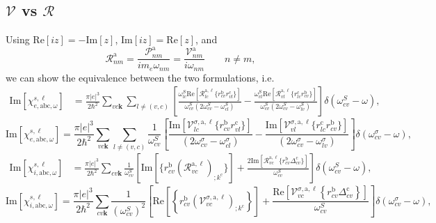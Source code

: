 \subsection{\texorpdfstring{$\mathcal{V}$ vs $\mathcal{R}$}{V vs R}}

Using 
$\mathrm{Re}[iz]=-\mathrm{Im}[z]$,
$\mathrm{Im}[iz]=\mathrm{Re}[z]$,
and
\begin{equation}\label{rnmenm91}
\mathcal{R}^\mathrm{a}_{nm}=\frac{\mathcal{P}^\mathrm{a}_{nm}}{im_e\omega_{nm}}=\frac{\mathcal{V}^\mathrm{a}_{nm}}{i\omega_{nm}}
\quad\quad n\ne m
,
\end{equation}
we can show the equivalence between the two formulations, i.e.
\begin{align}\label{imchiew}
\mathrm{Im}[\chi_{e,\mathrm{a}\mathrm{b}\mathrm{c},\omega}^{s,\ell}]
&=
\frac{\pi |e|^3}{2\hbar^2} 
\sum_{vc\mathbf{k}}
\sum_{l\neq(v,c)}
\left[
\frac{\omega^S_{lc}\mathrm{Re}[\mathcal{R}^{\mathrm{a},\ell}_{lc}\{r^{\mathrm{b}}_{cv}r^{\mathrm{c}}_{vl}\}]}
{\omega^S_{cv}(2\omega^S_{cv}-\omega^S_{cl})}
-
\frac{\omega^S_{vl}\mathrm{Re}[\mathcal{R}^{\mathrm{a},\ell}_{vl}\{r^{\mathrm{c}}_{lc}r^{\mathrm{b}}_{cv}\}]}
{\omega^S_{cv}(2\omega^S_{cv}-\omega^S_{lv})}
\right]
\delta(\omega^S_{cv}-\omega)
,
\end{align}  
\begin{equation}\label{c-calvimchiewn}
\mathrm{Im}[\chi_{e,\mathrm{a}\mathrm{b}\mathrm{c},\omega}^{s,\ell}] =
\frac{\pi |e|^3}{2\hbar^2}\sum_{vc\mathbf{k}}\sum_{l\neq(v,c)}\frac{1}{\omega^{S}_{cv}}
\left[
\frac{\mathrm{Im}[\mathcal{V}^{\sigma,\text{a},\ell}_{lc}\{r^{\mathrm{b}}_{cv}r^{\mathrm{c}}_{vl}\}]}
{(2\omega^\sigma_{cv}-\omega^\sigma_{cl})} 
-\frac{\mathrm{Im}[\mathcal{V}^{\sigma,\text{a},\ell}_{vl}\{r^{\mathrm{c}}_{lc}r^{\mathrm{b}}_{cv}\}]}
{(2\omega^\sigma_{cv}-\omega^\sigma_{lv})}
\right]\delta(\omega^\sigma_{cv}-\omega),
\end{equation}  
\begin{align}\label{imchiwf}
\mathrm{Im}[\chi_{i,\mathrm{a}\mathrm{b}\mathrm{c},\omega}^{s,\ell}]
&=
\frac{\pi|e|^3}{2\hbar^2}
\sum_{cv\mathbf{k}}
\frac{1}{\omega^S_{cv}}
\left[
\mathrm{Im}[\{r^{\mathrm{b}}_{cv}\left(\mathcal{R}^{\mathrm{a},\ell}_{vc}\right)_{;k^{\mathrm{c}}}\}]
+
\frac{2\mathrm{Im}[\mathcal{R}^{\mathrm{a},\ell}_{vc}\{r^{\mathrm{b}}_{cv}\Delta^{\mathrm{c}}_{cv}\}]}{\omega^S_{cv}}
\right]
\delta(\omega^S_{cv}-\omega)
,
\end{align}
\begin{equation}\label{c-calvimchiwn}
\mathrm{Im}[\chi_{i,\text{a}\text{b}\text{c},\omega}^{s,\ell}]
= \frac{\pi\vert e\vert^3}{2\hbar^2}\sum_{cv\mathbf{k}}\frac{1}{(\omega^{S}_{cv})^{2}}
\left[
\mathrm{Re}\left[\left\{r^{\text{b}}_{cv}\left(\mathcal{V}^{\sigma,\text{a},\ell}_{vc}\right)_{;k^{\text{c}}}\right\}\right]
+\frac{\mathrm{Re}\left[\mathcal{V}^{\sigma,\text{a},\ell}_{vc}\left\{r^{\text{b}}_{cv}
\Delta^{\text{c}}_{cv}\right\}\right]}{\omega^{S}_{cv}} 
\right]\delta(\omega^\sigma_{cv}-\omega),
\end{equation}
